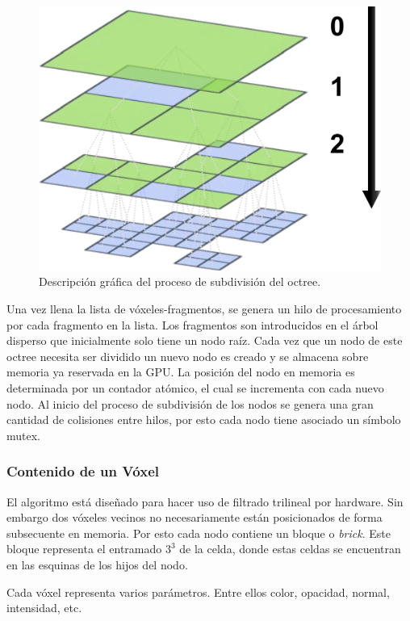 \begin{figure}
	\includegraphics[width=0.95\linewidth]{media/miplevels.png}
	\caption{Descripción gráfica del proceso de subdivisión del octree.}
	\label{fig:miplevels}
\end{figure}

Una vez llena la lista de vóxeles-fragmentos, se genera un hilo de procesamiento por cada fragmento en la lista. Los fragmentos son introducidos en el árbol disperso que inicialmente solo tiene un nodo raíz. Cada vez que un nodo de este octree necesita ser dividido un nuevo nodo es creado y se almacena sobre memoria ya reservada en la \ac{GPU}. La posición del nodo en memoria es determinada por un contador atómico, el cual se incrementa con cada nuevo nodo. Al inicio del proceso de subdivisión de los nodos se genera una gran cantidad de colisiones entre hilos, por esto cada nodo tiene asociado un símbolo mutex.

\subsubsection{Contenido de un Vóxel}
\label{subsub:voxelcontent_orig}

El algoritmo está diseñado para hacer uso de filtrado trilineal por hardware. Sin embargo dos vóxeles vecinos no necesariamente están posicionados de forma subsecuente en memoria. Por esto cada nodo contiene un bloque o \emph{brick}. Este bloque representa el entramado $3^3$ de la celda, donde estas celdas se encuentran en las esquinas de los hijos del nodo.

Cada vóxel representa varios parámetros. Entre ellos color, opacidad, normal, intensidad, etc.

